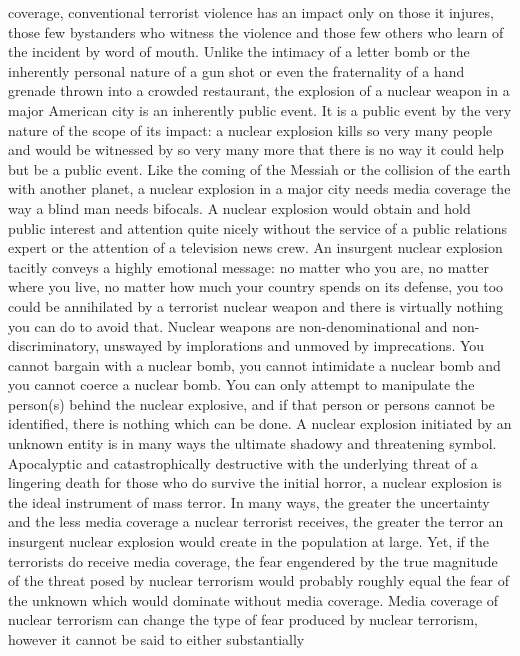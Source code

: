 coverage, conventional terrorist violence has an impact only on 
those it injures, those few bystanders who witness the violence and
those few others who learn of the incident by word of mouth. Unlike the
intimacy of a letter bomb or the inherently personal nature of a gun
shot or even the fraternality of a hand grenade thrown into a crowded
restaurant, the explosion of a nuclear weapon in a major American city is
an inherently public event. It is a public event by the very nature of 
the scope of its impact: a nuclear explosion kills so very many people
and would be witnessed by so very many more that there is no way it could
help but be a public event. Like the coming of the Messiah or the collision
of the earth with another planet, a nuclear explosion in a major city 
needs media coverage the way a blind man needs bifocals. A nuclear explosion
would obtain and hold public interest and attention quite nicely without
the service of a public relations expert or the attention of a television 
news crew.
\bigskip
An insurgent nuclear explosion tacitly conveys a highly emotional message:
no matter who you are, no matter where you live, no matter how much your
country spends on its defense, you too could be annihilated by a terrorist
nuclear weapon and there is virtually nothing you can do to avoid that.
Nuclear weapons are non-denominational and non-discriminatory, unswayed by
implorations and unmoved by imprecations. You cannot bargain with a nuclear
bomb, you cannot intimidate a nuclear bomb and you cannot coerce a nuclear
bomb. You can only attempt to manipulate the person(s) behind the nuclear
explosive, and if that person or persons cannot be identified, there is 
nothing which can be done.
\bigskip
A nuclear explosion initiated by an unknown entity is in many ways the 
ultimate shadowy and threatening symbol. Apocalyptic and catastrophically
destructive with the underlying threat of a lingering death for those who
do survive the initial horror, a nuclear explosion is the ideal instrument
of mass terror. In many ways, the greater the uncertainty and the less media
coverage a nuclear terrorist receives, the greater the terror an
insurgent nuclear explosion would create in the population at large. Yet, if
the terrorists do receive media coverage, the fear engendered by the true
magnitude of the threat posed by nuclear terrorism would probably roughly
equal the fear of the unknown which would dominate without media coverage.
Media coverage of nuclear terrorism can change the type of fear produced by
nuclear terrorism, however it cannot be said to either substantially
